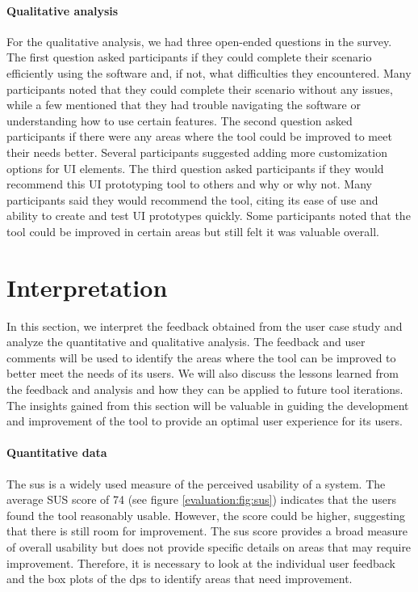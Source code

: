 \paragraph{Qualitative analysis}
For the qualitative analysis, we had three open-ended questions in the survey. 
The first question asked participants if they could complete their scenario efficiently using the software and, if not, what difficulties they encountered. 
Many participants noted that they could complete their scenario without any issues, while a few mentioned that they had trouble navigating the software or understanding how to use certain features.
The second question asked participants if there were any areas where the tool could be improved to meet their needs better. 
Several participants suggested adding more customization options for UI elements.
The third question asked participants if they would recommend this UI prototyping tool to others and why or why not. 
Many participants said they would recommend the tool, citing its ease of use and ability to create and test UI prototypes quickly. 
Some participants noted that the tool could be improved in certain areas but still felt it was valuable overall.

\clearpage
\section{Interpretation}
\label{evaluation:section:interpretation}
In this section, we interpret the feedback obtained from the user case study and analyze the quantitative and qualitative analysis. 
The feedback and user comments will be used to identify the areas where the tool can be improved to better meet the needs of its users. 
We will also discuss the lessons learned from the feedback and analysis and how they can be applied to future tool iterations. 
The insights gained from this section will be valuable in guiding the development and improvement of the tool to provide an optimal user experience for its users.

\paragraph{Quantitative data}
The \ac{sus} is a widely used measure of the perceived usability of a system. 
The average SUS score of 74 (see figure \ref{evaluation:fig:sus}) indicates that the users found the tool reasonably usable. 
However, the score could be higher, suggesting that there is still room for improvement. 
The \ac{sus} score provides a broad measure of overall usability but does not provide specific details on areas that may require improvement. 
Therefore, it is necessary to look at the individual user feedback and the box plots of the \ac{dp}s to identify areas that need improvement.

